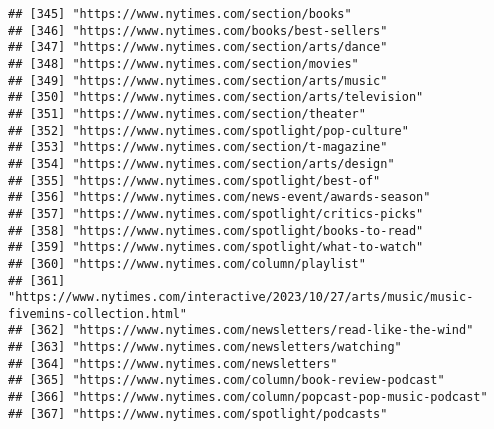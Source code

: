 \documentclass[
]{article}
\begin{document}
\begin{verbatim}
## [345] "https://www.nytimes.com/section/books"                                                                     
## [346] "https://www.nytimes.com/books/best-sellers"                                                                
## [347] "https://www.nytimes.com/section/arts/dance"                                                                
## [348] "https://www.nytimes.com/section/movies"                                                                    
## [349] "https://www.nytimes.com/section/arts/music"                                                                
## [350] "https://www.nytimes.com/section/arts/television"                                                           
## [351] "https://www.nytimes.com/section/theater"                                                                   
## [352] "https://www.nytimes.com/spotlight/pop-culture"                                                             
## [353] "https://www.nytimes.com/section/t-magazine"                                                                
## [354] "https://www.nytimes.com/section/arts/design"                                                               
## [355] "https://www.nytimes.com/spotlight/best-of"                                                                 
## [356] "https://www.nytimes.com/news-event/awards-season"                                                          
## [357] "https://www.nytimes.com/spotlight/critics-picks"                                                           
## [358] "https://www.nytimes.com/spotlight/books-to-read"                                                           
## [359] "https://www.nytimes.com/spotlight/what-to-watch"                                                           
## [360] "https://www.nytimes.com/column/playlist"                                                                   
## [361] "https://www.nytimes.com/interactive/2023/10/27/arts/music/music-fivemins-collection.html"                  
## [362] "https://www.nytimes.com/newsletters/read-like-the-wind"                                                    
## [363] "https://www.nytimes.com/newsletters/watching"                                                              
## [364] "https://www.nytimes.com/newsletters"                                                                       
## [365] "https://www.nytimes.com/column/book-review-podcast"                                                        
## [366] "https://www.nytimes.com/column/popcast-pop-music-podcast"                                                  
## [367] "https://www.nytimes.com/spotlight/podcasts"                                                                

\end{verbatim}
\end{document}
